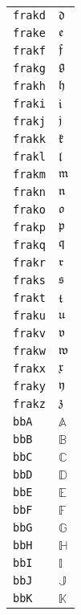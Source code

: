 \begin{longtable}{ll}
\texttt{frakd}&${}{\mathfrak{d}} {}$\\
\texttt{frake}&${}{\mathfrak{e}} {}$\\
\texttt{frakf}&${}{\mathfrak{f}} {}$\\
\texttt{frakg}&${}{\mathfrak{g}} {}$\\
\texttt{frakh}&${}{\mathfrak{h}} {}$\\
\texttt{fraki}&${}{\mathfrak{i}} {}$\\
\texttt{frakj}&${}{\mathfrak{j}} {}$\\
\texttt{frakk}&${}{\mathfrak{k}} {}$\\
\texttt{frakl}&${}{\mathfrak{l}} {}$\\
\texttt{frakm}&${}{\mathfrak{m}} {}$\\
\texttt{frakn}&${}{\mathfrak{n}} {}$\\
\texttt{frako}&${}{\mathfrak{o}} {}$\\
\texttt{frakp}&${}{\mathfrak{p}} {}$\\
\texttt{frakq}&${}{\mathfrak{q}} {}$\\
\texttt{frakr}&${}{\mathfrak{r}} {}$\\
\texttt{fraks}&${}{\mathfrak{s}} {}$\\
\texttt{frakt}&${}{\mathfrak{t}} {}$\\
\texttt{fraku}&${}{\mathfrak{u}} {}$\\
\texttt{frakv}&${}{\mathfrak{v}} {}$\\
\texttt{frakw}&${}{\mathfrak{w}} {}$\\
\texttt{frakx}&${}{\mathfrak{x}} {}$\\
\texttt{fraky}&${}{\mathfrak{y}} {}$\\
\texttt{frakz}&${}{\mathfrak{z}} {}$\\
\texttt{bbA}&${}{\mathbb{A}}{}$\\
\texttt{bbB}&${}{\mathbb{B}}{}$\\
\texttt{bbC}&${}{\mathbb{C}}{}$\\
\texttt{bbD}&${}{\mathbb{D}}{}$\\
\texttt{bbE}&${}{\mathbb{E}}{}$\\
\texttt{bbF}&${}{\mathbb{F}}{}$\\
\texttt{bbG}&${}{\mathbb{G}}{}$\\
\texttt{bbH}&${}{\mathbb{H}}{}$\\
\texttt{bbI}&${}{\mathbb{I}}{}$\\
\texttt{bbJ}&${}{\mathbb{J}}{}$\\
\texttt{bbK}&${}{\mathbb{K}}{}$\\

\end{longtable}
